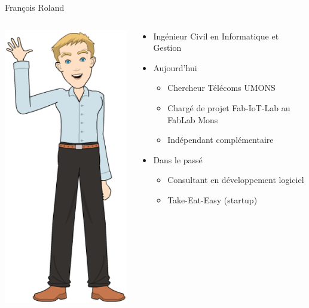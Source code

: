 \documentclass[aspectratio=169,utf8,french]{beamer}
\begin{document}
\begin{frame}{François Roland}
  \begin{columns}
    \begin{column}{.3\textwidth}
      \begin{flushright}
        \includegraphics[height=.8\textheight]{pictures/francois1.png}
      \end{flushright}
    \end{column}
    \begin{column}{.7\textwidth}
      \begin{itemize}
        \item Ingénieur Civil en Informatique et Gestion
        \item Aujourd'hui
          \begin{itemize}
            \item Chercheur Télécoms UMONS
            \item Chargé de projet Fab-IoT-Lab au FabLab Mons
            \item Indépendant complémentaire
          \end{itemize}
        \item Dans le passé
          \begin{itemize}
            \item Consultant en développement logiciel
            \item Take-Eat-Easy (startup)
          \end{itemize}
      \end{itemize}
    \end{column}
  \end{columns}
\end{frame}
\end{document}
